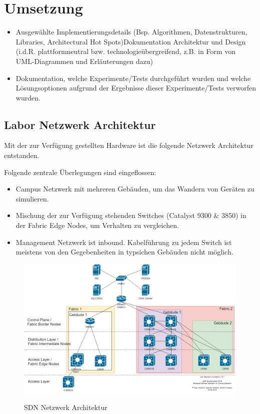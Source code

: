 \section{Umsetzung}

\begin{itemize}
	\item Ausgewählte Implementierungsdetails (Bsp. Algorithmen, Datenstrukturen, Libraries, Architectural Hot Spots)Dokumentation Architektur und Design (i.d.R. plattformneutral bzw. technologieübergreifend, z.B. in Form von UML-Diagrammen und Erläuterungen dazu)
	\item Dokumentation, welche Experimente/Tests durchgeführt wurden und welche Lösungsoptionen aufgrund der Ergebnisse dieser Experimente/Tests verworfen wurden.
\end{itemize}

\subsection{Labor Netzwerk Architektur} \label{subsec:Labor-Netzwerk-Architektur}
Mit der zur Verfügung gestellten Hardware ist die folgende Netzwerk Architektur entstanden.

Folgende zentrale Überlegungen sind eingeflossen:

\begin{itemize}
	\item Campus Netzwerk mit mehreren Gebäuden, um das Wandern von Geräten zu simulieren.
	\item Mischung der zur Verfügung stehenden Switches (Catalyst 9300 \& 3850) in der Fabric Edge Nodes, um Verhalten zu vergleichen.
	\item Management Netzwerk ist inbound. Kabelführung zu jedem Switch ist meistens von den Gegebenheiten in typsichen Gebäuden nicht möglich.
\end{itemize}


\begin{figure}[H]
	\centering
	\includegraphics[width=1\linewidth]{img/LabNetworkArchitecture.png}\\[1px]
	\caption{SDN Netzwerk Architektur}
	\label{fig:LabNetworkArchitecture}
\end{figure}

